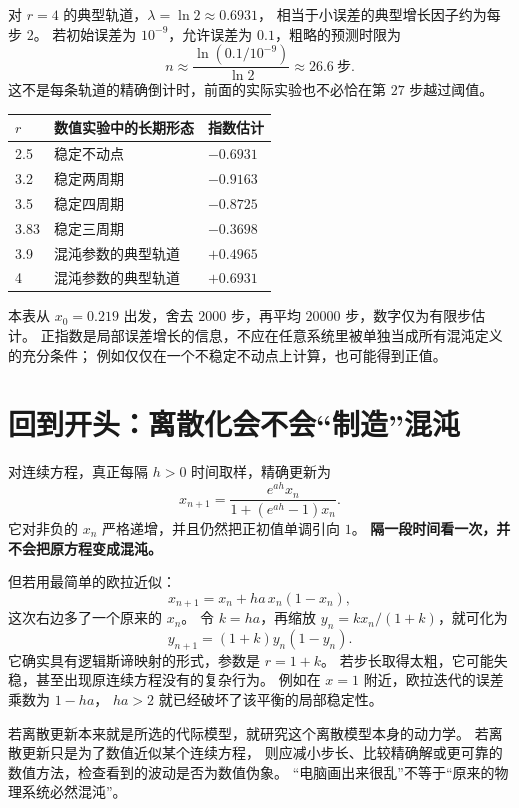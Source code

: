 \documentclass[UTF8,11pt,fontset=none]{ctexart}
\begin{document}
对 $r=4$ 的典型轨道，$\lambda=\ln2\approx0.6931$，
相当于小误差的典型增长因子约为每步 $2$。
若初始误差为 $10^{-9}$，允许误差为 $0.1$，粗略的预测时限为
\[
n\approx\frac{\ln(0.1/10^{-9})}{\ln2}\approx26.6\ \text{步}.
\]
这不是每条轨道的精确倒计时，前面的实际实验也不必恰在第 $27$ 步越过阈值。

\begin{center}
\begin{tabular}{lll}
\toprule
$r$ & 数值实验中的长期形态 & 指数估计\\\midrule
2.5 & 稳定不动点 & $-0.6931$\\
3.2 & 稳定两周期 & $-0.9163$\\
3.5 & 稳定四周期 & $-0.8725$\\
3.83 & 稳定三周期 & $-0.3698$\\
3.9 & 混沌参数的典型轨道 & $+0.4965$\\
4 & 混沌参数的典型轨道 & $+0.6931$\\\bottomrule
\end{tabular}
\end{center}
本表从 $x_0=0.219$ 出发，舍去 $2000$ 步，再平均 $20000$ 步，数字仅为有限步估计。
正指数是局部误差增长的信息，不应在任意系统里被单独当成所有混沌定义的充分条件；
例如仅仅在一个不稳定不动点上计算，也可能得到正值。

\section{回到开头：离散化会不会“制造”混沌}
对连续方程，真正每隔 $h>0$ 时间取样，精确更新为
\[
x_{n+1}=\frac{e^{ah}x_n}{1+(e^{ah}-1)x_n}.
\]
它对非负的 $x_n$ 严格递增，并且仍然把正初值单调引向 $1$。
\textbf{隔一段时间看一次，并不会把原方程变成混沌。}

但若用最简单的欧拉近似：
\[
x_{n+1}=x_n+ha\,x_n(1-x_n),
\]
这次右边多了一个原来的 $x_n$。
令 $k=ha$，再缩放 $y_n=kx_n/(1+k)$，就可化为
\[
y_{n+1}=(1+k)y_n(1-y_n).
\]
它确实具有逻辑斯谛映射的形式，参数是 $r=1+k$。
若步长取得太粗，它可能失稳，甚至出现原连续方程没有的复杂行为。
例如在 $x=1$ 附近，欧拉迭代的误差乘数为 $1-ha$，
$ha>2$ 就已经破坏了该平衡的局部稳定性。

\begin{keybox}
若离散更新本来就是所选的代际模型，就研究这个离散模型本身的动力学。
若离散更新只是为了数值近似某个连续方程，
则应减小步长、比较精确解或更可靠的数值方法，检查看到的波动是否为数值伪象。
“电脑画出来很乱”不等于“原来的物理系统必然混沌”。
\end{keybox}
\end{document}
